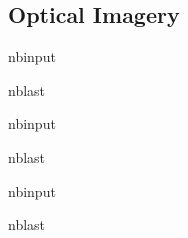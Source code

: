 \documentclass[letterpaper,10pt,english]{sphinxmanual}
\begin{document}
\subsection{Optical Imagery}
\label{\detokenize{notebooks/MudCreek_Landslide_optical:Optical-Imagery}}
\begin{sphinxuseclass}{nbinput}
\begin{sphinxuseclass}{nblast}
{
\begin{sphinxVerbatim}[commandchars=\\\{\}]
\llap{\color{nbsphinxin}[ ]:\,\hspace{\fboxrule}\hspace{\fboxsep}}
\end{sphinxVerbatim}
}

\end{sphinxuseclass}
\end{sphinxuseclass}
\begin{sphinxuseclass}{nbinput}
\begin{sphinxuseclass}{nblast}
{
\begin{sphinxVerbatim}[commandchars=\\\{\}]
\llap{\color{nbsphinxin}[ ]:\,\hspace{\fboxrule}\hspace{\fboxsep}}
\end{sphinxVerbatim}
}

\end{sphinxuseclass}
\end{sphinxuseclass}
\begin{sphinxuseclass}{nbinput}
\begin{sphinxuseclass}{nblast}
{
\begin{sphinxVerbatim}[commandchars=\\\{\}]
\llap{\color{nbsphinxin}[ ]:\,\hspace{\fboxrule}\hspace{\fboxsep}}
\end{sphinxVerbatim}
}

\end{sphinxuseclass}
\end{sphinxuseclass}
\end{document}
